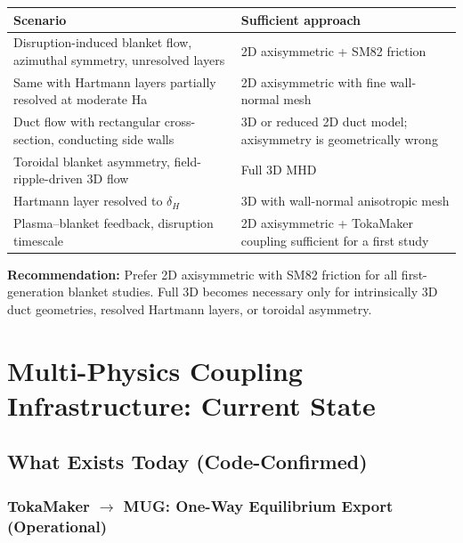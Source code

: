 \documentclass[11pt,letterpaper]{article}
\begin{document}
\begin{center}
\begin{longtable}{p{}p{}}
\toprule
\textbf{Scenario} & \textbf{Sufficient approach} \\
\midrule
Disruption-induced blanket flow, azimuthal symmetry, unresolved layers &
  2D axisymmetric + SM82 friction \\
\addlinespace
Same with Hartmann layers partially resolved at moderate Ha &
  2D axisymmetric with fine wall-normal mesh \\
\addlinespace
Duct flow with rectangular cross-section, conducting side walls &
  3D or reduced 2D duct model; axisymmetry is geometrically wrong \\
\addlinespace
Toroidal blanket asymmetry, field-ripple-driven 3D flow &
  Full 3D MHD \\
\addlinespace
Hartmann layer resolved to $\delta_H$ &
  3D with wall-normal anisotropic mesh \\
\addlinespace
Plasma--blanket feedback, disruption timescale &
  2D axisymmetric + TokaMaker coupling sufficient for a first study \\
\bottomrule
\end{longtable}
\end{center}

\textbf{Recommendation:} Prefer 2D axisymmetric with SM82 friction for all
first-generation blanket studies.  Full 3D becomes necessary only for
intrinsically 3D duct geometries, resolved Hartmann layers, or toroidal
asymmetry.

\section{Multi-Physics Coupling Infrastructure: Current State}
\label{sec:coupling_current}

\subsection{What Exists Today (Code-Confirmed)}

\subsubsection{TokaMaker $\to$ MUG: One-Way Equilibrium Export (Operational)}
\end{document}
